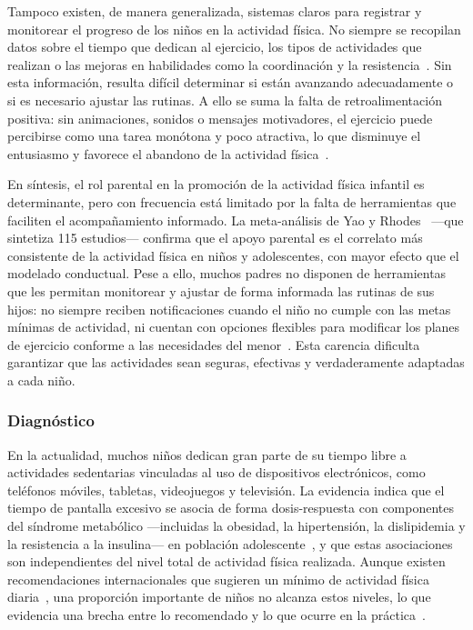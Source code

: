 				Tampoco existen, de manera generalizada, sistemas claros para registrar y monitorear el progreso de los niños en la actividad física. No siempre se recopilan datos sobre el tiempo que dedican al ejercicio, los tipos de actividades que realizan o las mejoras en habilidades como la coordinación y la resistencia~\cite{Direito2017}. Sin esta información, resulta difícil determinar si están avanzando adecuadamente o si es necesario ajustar las rutinas. A ello se suma la falta de retroalimentación positiva: sin animaciones, sonidos o mensajes motivadores, el ejercicio puede percibirse como una tarea monótona y poco atractiva, lo que disminuye el entusiasmo y favorece el abandono de la actividad física~\cite{Xu2022}.
				
				En síntesis, el rol parental en la promoción de la actividad física infantil es determinante, pero con frecuencia está limitado por la falta de herramientas que faciliten el acompañamiento informado. La meta-análisis de Yao y Rhodes~\cite{Yao2015} ---que sintetiza 115 estudios--- confirma que el apoyo parental es el correlato más consistente de la actividad física en niños y adolescentes, con mayor efecto que el modelado conductual. Pese a ello, muchos padres no disponen de herramientas que les permitan monitorear y ajustar de forma informada las rutinas de sus hijos: no siempre reciben notificaciones cuando el niño no cumple con las metas mínimas de actividad, ni cuentan con opciones flexibles para modificar los planes de ejercicio conforme a las necesidades del menor~\cite{Hesketh2017}. Esta carencia dificulta garantizar que las actividades sean seguras, efectivas y verdaderamente adaptadas a cada niño.

				\subsubsection{Diagnóstico}
					En la actualidad, muchos niños dedican gran parte de su tiempo libre a actividades sedentarias vinculadas al uso de dispositivos electrónicos, como teléfonos móviles, tabletas, videojuegos y televisión. La evidencia indica que el tiempo de pantalla excesivo se asocia de forma dosis-respuesta con componentes del síndrome metabólico ---incluidas la obesidad, la hipertensión, la dislipidemia y la resistencia a la insulina--- en población adolescente~\cite{Musa2022}, y que estas asociaciones son independientes del nivel total de actividad física realizada. Aunque existen recomendaciones internacionales que sugieren un mínimo de actividad física diaria~\cite{Bull2020}, una proporción importante de niños no alcanza estos niveles, lo que evidencia una brecha entre lo recomendado y lo que ocurre en la práctica~\cite{Guthold2020}.
					
